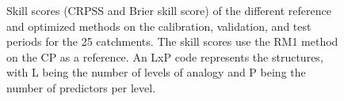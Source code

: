 \documentclass[draft]{agujournal2019}
\begin{document}
\begin{figure}[hbtp]
	\noindent{}
	\caption{Skill scores (CRPSS and Brier skill score) of the different reference and optimized methods on the calibration, validation, and test periods for the 25 catchments. The skill scores use the RM1 method on the CP as a reference. An LxP code represents the structures, with L being the number of levels of analogy and P being the number of predictors per level.}
	\label{fig_scores}
\end{figure}
\end{document}
